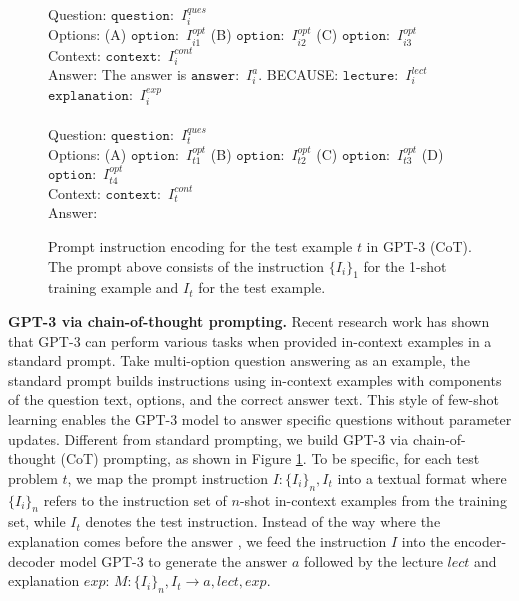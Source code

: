  \begin{figure}[t!]
\vspace{-1mm}
\centering
\footnotesize
\fontsize{8.5pt}{\baselineskip}\selectfont \begin{boxedminipage}{0.98\columnwidth}
Question: $\mathtt{question:}$ ${I_i^{ques}}$ \\
Options: (A) $\mathtt{option:}$ ${I_{i1}^{opt}}$ (B) $\mathtt{option:}$ ${I_{i2}^{opt}}$ (C) $\mathtt{option:}$ ${I_{i3}^{opt}}$ \\
Context: $\mathtt{context:}$  ${I_i^{cont}}$ \\
Answer: The answer is $\mathtt{answer:}$ $I_i^{a}$. BECAUSE: $\mathtt{lecture:}$ $I_i^{lect}$ ~ $\mathtt{explanation:}$ $I_i^{exp}$ \\
\\
Question: $\mathtt{question:}$ ${I_t^{ques}}$ \\
Options: (A) $\mathtt{option:}$ ${I_{t1}^{opt}}$ (B) $\mathtt{option:}$ ${I_{t2}^{opt}}$ (C) $\mathtt{option:}$ ${I_{t3}^{opt}}$ (D) $\mathtt{option:}$ ${I_{t4}^{opt}}$\\
Context: $\mathtt{context:}$ ${I_t^{cont}}$ \\
Answer:
\end{boxedminipage}
\caption{Prompt instruction encoding for the test example $t$ in GPT-3 (CoT). The prompt above consists of the instruction ${\{I_i\}_1}$ for the 1-shot training example and ${I_t}$ for the test example.}
\vspace{-1mm}
\label{fig:prompt_encoding}
\end{figure}

\textbf{GPT-3 via chain-of-thought prompting.} Recent research work \cite{chen2020big,mishra2022lila,lu2022dynamic} has shown that GPT-3 \cite{chen2020big} can perform various tasks when provided in-context examples in a standard prompt. Take multi-option question answering as an example, the standard prompt \cite{lu2021fantastically,zhao2021calibrate,liu2021makes} builds instructions using in-context examples with components of the question text, options, and the correct answer text. This style of few-shot learning enables the GPT-3 model to answer specific questions without parameter updates. Different from standard prompting, we build GPT-3 via chain-of-thought (CoT) prompting, as shown in Figure \ref{fig:prompt_encoding}. To be specific, for each test problem $t$, we map the prompt instruction $I: \{I_i\}_n, I_t$ into a textual format where $\{I_i\}_n$ refers to the instruction set of $n$-shot in-context examples from the training set, while  $I_t$ denotes the test instruction. Instead of the way where the explanation comes before the answer \cite{wei2022chain}, we feed the instruction $I$ into the encoder-decoder model GPT-3 to generate the answer $a$ followed by the lecture $lect$ and explanation $exp$: $M: \{I_i\}_n, I_t \rightarrow a, lect, exp$.




